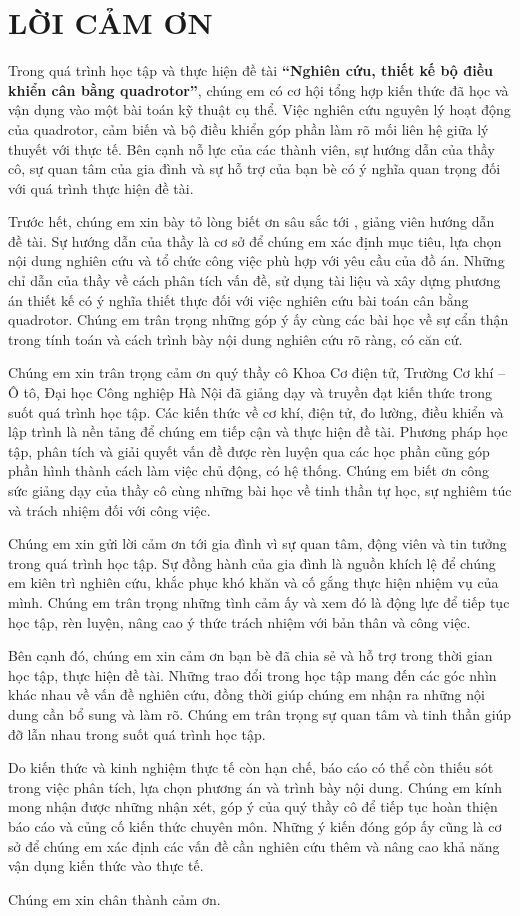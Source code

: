 \chapter*{LỜI CẢM ƠN}

Trong quá trình học tập và thực hiện đề tài \textbf{``Nghiên cứu, thiết kế bộ điều khiển cân bằng quadrotor''}, chúng em có cơ hội tổng hợp kiến thức đã học và vận dụng vào một bài toán kỹ thuật cụ thể. Việc nghiên cứu nguyên lý hoạt động của quadrotor, cảm biến và bộ điều khiển góp phần làm rõ mối liên hệ giữa lý thuyết với thực tế. Bên cạnh nỗ lực của các thành viên, sự hướng dẫn của thầy cô, sự quan tâm của gia đình và sự hỗ trợ của bạn bè có ý nghĩa quan trọng đối với quá trình thực hiện đề tài.

Trước hết, chúng em xin bày tỏ lòng biết ơn sâu sắc tới \textbf{\SupervisorName}, giảng viên hướng dẫn đề tài. Sự hướng dẫn của thầy là cơ sở để chúng em xác định mục tiêu, lựa chọn nội dung nghiên cứu và tổ chức công việc phù hợp với yêu cầu của đồ án. Những chỉ dẫn của thầy về cách phân tích vấn đề, sử dụng tài liệu và xây dựng phương án thiết kế có ý nghĩa thiết thực đối với việc nghiên cứu bài toán cân bằng quadrotor. Chúng em trân trọng những góp ý ấy cùng các bài học về sự cẩn thận trong tính toán và cách trình bày nội dung nghiên cứu rõ ràng, có căn cứ.

Chúng em xin trân trọng cảm ơn quý thầy cô Khoa Cơ điện tử, Trường Cơ khí -- Ô tô, Đại học Công nghiệp Hà Nội đã giảng dạy và truyền đạt kiến thức trong suốt quá trình học tập. Các kiến thức về cơ khí, điện tử, đo lường, điều khiển và lập trình là nền tảng để chúng em tiếp cận và thực hiện đề tài. Phương pháp học tập, phân tích và giải quyết vấn đề được rèn luyện qua các học phần cũng góp phần hình thành cách làm việc chủ động, có hệ thống. Chúng em biết ơn công sức giảng dạy của thầy cô cùng những bài học về tinh thần tự học, sự nghiêm túc và trách nhiệm đối với công việc.

Chúng em xin gửi lời cảm ơn tới gia đình vì sự quan tâm, động viên và tin tưởng trong quá trình học tập. Sự đồng hành của gia đình là nguồn khích lệ để chúng em kiên trì nghiên cứu, khắc phục khó khăn và cố gắng thực hiện nhiệm vụ của mình. Chúng em trân trọng những tình cảm ấy và xem đó là động lực để tiếp tục học tập, rèn luyện, nâng cao ý thức trách nhiệm với bản thân và công việc.

Bên cạnh đó, chúng em xin cảm ơn bạn bè đã chia sẻ và hỗ trợ trong thời gian học tập, thực hiện đề tài. Những trao đổi trong học tập mang đến các góc nhìn khác nhau về vấn đề nghiên cứu, đồng thời giúp chúng em nhận ra những nội dung cần bổ sung và làm rõ. Chúng em trân trọng sự quan tâm và tinh thần giúp đỡ lẫn nhau trong suốt quá trình học tập.

Do kiến thức và kinh nghiệm thực tế còn hạn chế, báo cáo có thể còn thiếu sót trong việc phân tích, lựa chọn phương án và trình bày nội dung. Chúng em kính mong nhận được những nhận xét, góp ý của quý thầy cô để tiếp tục hoàn thiện báo cáo và củng cố kiến thức chuyên môn. Những ý kiến đóng góp ấy cũng là cơ sở để chúng em xác định các vấn đề cần nghiên cứu thêm và nâng cao khả năng vận dụng kiến thức vào thực tế.

Chúng em xin chân thành cảm ơn.
